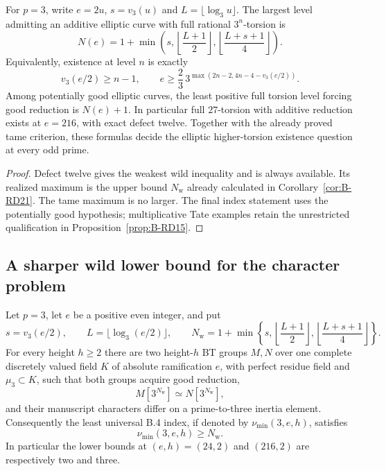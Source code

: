 \begin{corollary}
\label{cor:B-RD27-exact-three}
For $p=3$, write $e=2u$, $s=v_3(u)$ and
$L=\lfloor\log_3u\rfloor$. The largest level admitting an additive
elliptic curve with full rational $3^n$-torsion is
\[
 N(e)=1+\min\left(s,\left\lfloor\frac{L+1}{2}\right\rfloor,
                         \left\lfloor\frac{L+s+1}{4}\right\rfloor\right).
                                                        \tag{B-RD27.1}
\]
Equivalently, existence at level $n$ is exactly
\[
  v_3(e/2)\geq n-1,\qquad
  e\geq\frac23\,3^{\max(2n-2,4n-4-v_3(e/2))}.          \tag{B-RD27.2}
\]
Among potentially good elliptic curves, the least positive full
torsion level forcing good reduction is $N(e)+1$.
In particular full $27$-torsion with additive reduction exists
at $e=216$, with exact defect twelve. Together with the already
proved tame criterion, these formulas decide the elliptic
higher-torsion existence question at every odd prime.
\end{corollary}

\begin{proof}
Defect twelve gives the weakest wild inequality and is always
available. Its realized maximum is the upper bound $N_{\mathrm w}$
already calculated in Corollary~\ref{cor:B-RD21}. The tame maximum
is no larger. The final index statement uses the potentially good
hypothesis; multiplicative Tate examples retain the unrestricted
qualification in Proposition~\ref{prop:B-RD15}.
\end{proof}


\subsection{A sharper wild lower bound for the character problem}

\begin{proposition}
\label{prop:B-RD28-wild-character}
Let $p=3$, let $e$ be a positive even integer, and put
\[
 s=v_3(e/2),\qquad L=\lfloor\log_3(e/2)\rfloor,\qquad
 N_{\mathrm w}=1+\min\left\{s,
     \left\lfloor\frac{L+1}{2}\right\rfloor,
     \left\lfloor\frac{L+s+1}{4}\right\rfloor\right\}.
\]
For every height $h\geq2$ there are two height-$h$ BT groups
$M,N$ over one complete discretely valued field $K$ of absolute
ramification $e$, with perfect residue field and $\mu_3\subset K$,
such that both groups acquire good reduction,
\[
                 M[3^{N_{\mathrm w}}]\simeq
                 N[3^{N_{\mathrm w}}],
\]
and their manuscript characters differ on a prime-to-three
inertia element. Consequently the least universal B.4 index,
if denoted by $\nu_{\min}(3,e,h)$, satisfies
\[
                       \nu_{\min}(3,e,h)\geq N_{\mathrm w}.
                                                        \tag{B-RD28.1}
\]
In particular the lower bounds at $(e,h)=(24,2)$ and $(216,2)$
are respectively two and three.
\end{proposition}

